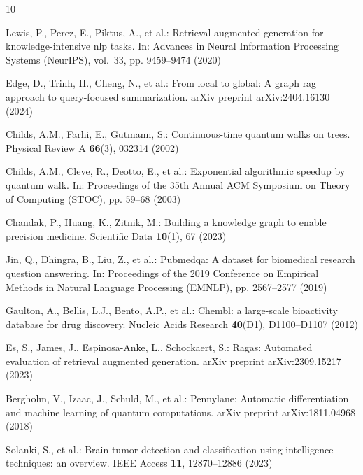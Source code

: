 \documentclass[sn-basic,Numbered]{sn-jnl}
\begin{document}
\begin{thebibliography}{10}
\providecommand{\url}[1]{\texttt{#1}}
\providecommand{\urlprefix}{URL }
\providecommand{\doi}[1]{https://doi.org/#1}

Lewis, P., Perez, E., Piktus, A., et al.: Retrieval-augmented generation for knowledge-intensive nlp tasks. In: Advances in Neural Information Processing Systems (NeurIPS), vol.~33, pp. 9459--9474 (2020)

Edge, D., Trinh, H., Cheng, N., et al.: From local to global: A graph rag approach to query-focused summarization. arXiv preprint arXiv:2404.16130 (2024)

Childs, A.M., Farhi, E., Gutmann, S.: Continuous-time quantum walks on trees. Physical Review A \textbf{66}(3), 032314 (2002)

Childs, A.M., Cleve, R., Deotto, E., et al.: Exponential algorithmic speedup by quantum walk. In: Proceedings of the 35th Annual ACM Symposium on Theory of Computing (STOC), pp. 59--68 (2003)

Chandak, P., Huang, K., Zitnik, M.: Building a knowledge graph to enable precision medicine. Scientific Data \textbf{10}(1), 67 (2023)

Jin, Q., Dhingra, B., Liu, Z., et al.: Pubmedqa: A dataset for biomedical research question answering. In: Proceedings of the 2019 Conference on Empirical Methods in Natural Language Processing (EMNLP), pp. 2567--2577 (2019)

Gaulton, A., Bellis, L.J., Bento, A.P., et al.: Chembl: a large-scale bioactivity database for drug discovery. Nucleic Acids Research \textbf{40}(D1), D1100--D1107 (2012)

Es, S., James, J., Espinosa-Anke, L., Schockaert, S.: Ragas: Automated evaluation of retrieval augmented generation. arXiv preprint arXiv:2309.15217 (2023)

Bergholm, V., Izaac, J., Schuld, M., et al.: Pennylane: Automatic differentiation and machine learning of quantum computations. arXiv preprint arXiv:1811.04968 (2018)

Solanki, S., et al.: Brain tumor detection and classification using intelligence techniques: an overview. IEEE Access \textbf{11}, 12870--12886 (2023)

\end{thebibliography}
\end{document}
